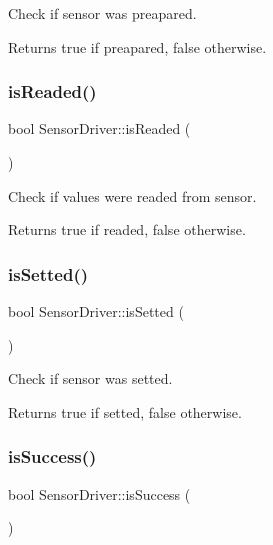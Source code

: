 Check if sensor was preapared. 

\begin{DoxyReturn}{Returns}
true if preapared, false otherwise. 
\end{DoxyReturn}
\mbox{\label{classSensorDriver_a65f1930e35568439dee39259a23a5670}} 
\subsubsection{\texorpdfstring{is\+Readed()}{isReaded()}}
{\footnotesize\ttfamily bool Sensor\+Driver\+::is\+Readed (\begin{DoxyParamCaption}{ }\end{DoxyParamCaption})}



Check if values were readed from sensor. 

\begin{DoxyReturn}{Returns}
true if readed, false otherwise. 
\end{DoxyReturn}
\mbox{\label{classSensorDriver_a0f64839cf7719b5782c93e54485d3b11}} 
\subsubsection{\texorpdfstring{is\+Setted()}{isSetted()}}
{\footnotesize\ttfamily bool Sensor\+Driver\+::is\+Setted (\begin{DoxyParamCaption}{ }\end{DoxyParamCaption})\hspace{0.3cm}{\ttfamily [virtual]}}



Check if sensor was setted. 

\begin{DoxyReturn}{Returns}
true if setted, false otherwise. 
\end{DoxyReturn}
\mbox{\label{classSensorDriver_af8d094335bc75fbf1390ee5b498eec69}} 
\subsubsection{\texorpdfstring{is\+Success()}{isSuccess()}}
{\footnotesize\ttfamily bool Sensor\+Driver\+::is\+Success (\begin{DoxyParamCaption}{ }\end{DoxyParamCaption})}



